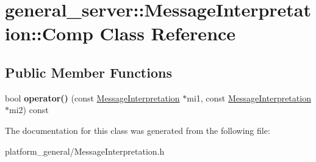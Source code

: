 \hypertarget{classgeneral__server_1_1MessageInterpretation_1_1Comp}{\section{general\-\_\-server\-:\-:\-Message\-Interpretation\-:\-:\-Comp \-Class \-Reference}
\label{classgeneral__server_1_1MessageInterpretation_1_1Comp}
}
\subsection*{\-Public \-Member \-Functions}
\begin{DoxyCompactItemize}
\item 
\hypertarget{classgeneral__server_1_1MessageInterpretation_1_1Comp_ac94a451f84795038c461baa84354ca2b}{bool {\bfseries operator()} (const \hyperlink{classgeneral__server_1_1MessageInterpretation}{\-Message\-Interpretation} $\ast$mi1, const \hyperlink{classgeneral__server_1_1MessageInterpretation}{\-Message\-Interpretation} $\ast$mi2) const }\label{classgeneral__server_1_1MessageInterpretation_1_1Comp_ac94a451f84795038c461baa84354ca2b}

\end{DoxyCompactItemize}


\-The documentation for this class was generated from the following file\-:\begin{DoxyCompactItemize}
\item 
platform\-\_\-general/\-Message\-Interpretation.\-h\end{DoxyCompactItemize}
